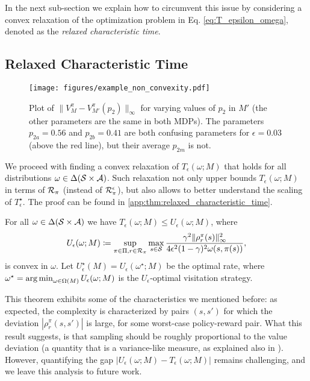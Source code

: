 In the next sub-section we explain how to circumvent this issue by considering a convex relaxation of the optimization problem in Eq. \ref{eq:T_epsilon_omega}, denoted as the \emph{relaxed characteristic time}.


\subsection{Relaxed Characteristic Time}
\begin{figure}[t]
    \centering
    \texttt{[image: figures/example\_non\_convexity.pdf]}
    \caption{Plot of $\|V_{M}^\pi-V_{M'}^\pi(p_2)\|_\infty$ for varying values of $p_2$ in $M'$ (the other parameters are the same in both MDPs). The parameters $p_{2a}=0.56$ and $p_{2b}=0.41$ are both confusing parameters for $\epsilon=0.03$ (above the red line), but their average $p_{2m}$ is not.}
    \label{fig:non-convexity-example-plot}
\end{figure}
We proceed with finding a convex relaxation of $T_\epsilon(\omega;M)$ that holds for all distributions $\omega\in \Delta({\cal S}\times {\cal A})$.
Such relaxation not only upper bounds $T_\epsilon(\omega;M)$  in terms of ${\cal R}_\pi$ (instead of ${\cal R}_\pi^\epsilon$), but also allows   to better understand the scaling of $T_\epsilon^\star$. The proof can be found in \cref{app:thm:relaxed_characteristic_time}.
\begin{tcolorbox}
\begin{theorem}\label{thm:relaxed_characteristic_time}
    For all $\omega\in \Delta({\cal S}\times {\cal A})$ we have $T_\epsilon(\omega;M)\leq U_\epsilon(\omega;M)$, where
    \begin{equation}
U_\epsilon(\omega;M)\coloneqq \sup_{\pi\in \Pi,r\in {\cal R}_\pi} \max_{s\in{\cal S}} \frac{\gamma^2 \|\rho_r^\pi(s)\|_\infty^2}{4\epsilon^2 (1-\gamma)^2 \omega(s,\pi(s))},
    \end{equation}
 is convex in $\omega$.
Let  $U_\epsilon^\star(M) = U_\epsilon(\omega^\star;M)$ be the optimal  rate, where $\omega^\star=\operatorname*{arg\,min}_{\omega\in \Omega(M)}U_\epsilon(\omega;M)$ is the $U_\epsilon$-optimal visitation strategy.
\end{theorem}
\end{tcolorbox}
This theorem exhibits some of the characteristics we mentioned before: as expected, the complexity is characterized by  pairs $(s,s')$ for which the   deviation $|\rho_r^\pi(s,s')|$  is large, for some worst-case policy-reward pair. 
What this result suggests, is that sampling should be roughly proportional to the value deviation (a quantity that  is a variance-like measure, as explained also in \cite{russo2023model}). However, quantifying the gap $|U_\epsilon(\omega;M)-T_\epsilon(\omega;M)|$ remains challenging, and we leave this analysis to future work.

